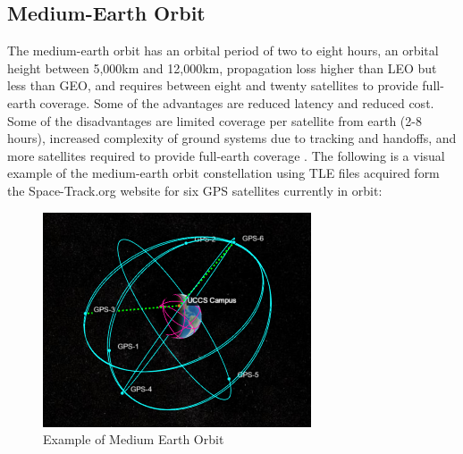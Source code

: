 \documentclass[conference]{IEEEtran}
\begin{document}
\subsection{Medium-Earth Orbit}
The medium-earth orbit has an orbital period of two to eight hours, an orbital height between 5,000km and 12,000km, propagation loss higher than LEO but less than GEO, and requires between eight and twenty satellites to provide full-earth coverage. Some of the advantages are reduced latency and reduced cost. Some of the disadvantages are limited coverage per satellite from earth (2-8 hours), increased complexity of ground systems due to tracking and handoffs, and more satellites required to provide full-earth coverage \cite{b19}. The following is a visual example of the medium-earth orbit constellation using TLE files acquired form the Space-Track.org website for six GPS satellites currently in orbit:
\begin{figure}[h]
\centerline{\includegraphics{constellation4copy.png}}
\caption{Example of Medium Earth Orbit}
\label{fig:6}
\end{figure}
\end{document}
